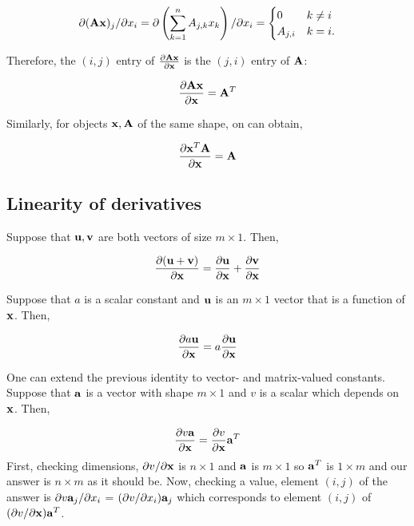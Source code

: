 \begin{align*}
  \partial ({\bf A} {\bf x})_j/\partial x_i = \partial \left( \sum_{k=1}^n A_{j,k} x_k \right)/ \partial x_i =
  \begin{cases}
    0       & k \not= i \\
    A_{j,i} & k = i.
  \end{cases}
\end{align*}

\noindent Therefore, the $(i,j)$ entry of $\frac{\partial {\bf A} {\bf x}}{\partial {\bf x}}$ is the $(j,i)$ entry of ${\bf A}$:

\begin{equation}
  \frac{\partial {\bf A} {\bf x}}{\partial {\bf x}} = {\bf A}^T \label{eq:Ax}
\end{equation}

\noindent Similarly, for objects ${\bf x}, {\bf A}$ of the same shape, on can obtain,

\begin{equation}
  \frac{\partial {\bf x}^T {\bf A}}{\partial {\bf x}} = {\bf A}
  \label{eq:xTA}
\end{equation}

\subsection{Linearity of derivatives}

Suppose that ${\bf u}, {\bf v}$ are both vectors of size $m \times 1$. Then,

\begin{equation}
  \frac{\partial ({\bf u} + {\bf v})}{\partial {\bf x}} = \frac{\partial
    {\bf u}}{\partial {\bf x}} + \frac{\partial {\bf v}}{\partial {\bf x}}
  \label{eq:uplusv}
\end{equation}

\noindent Suppose that $a$ is a scalar constant and ${\bf u}$ is an $m\times 1$ vector that is a function of ${\bf x}$. Then,

\begin{equation}\frac{\partial a {\bf u}}{\partial {\bf x}} = a \frac{\partial {\bf u}}{ \partial {\bf x}}\end{equation}

One can extend the previous identity to vector- and matrix-valued constants. Suppose that ${\bf a}$ is a vector with shape $m \times 1$ and $v$ is a scalar which depends on ${\bf x}$. Then,

\begin{equation}\frac{\partial v {\bf a}}{\partial {\bf x}} = \frac{\partial
    v}{\partial {\bf x}}{\bf a}^T\end{equation}
First, checking dimensions, $\partial v/\partial {\bf x}$ is $n \times
  1$ and ${\bf a}$ is $m \times 1$ so ${\bf a}^T$ is $1 \times m$ and our
answer is $n \times m$ as it should be.  Now, checking a value,
element $(i,j)$ of the answer is $\partial v {\bf a}_j / \partial x_i$ =
$(\partial v / \partial x_i) {\bf a}_j$ which corresponds to element
$(i,j)$ of $(\partial v / \partial {\bf x}){\bf a}^T$.

